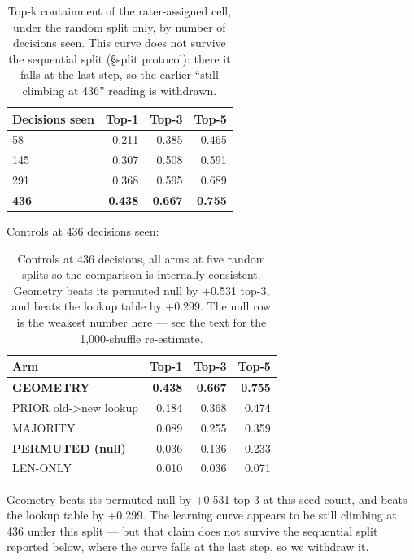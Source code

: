 \documentclass[11pt]{article}
\begin{document}
\begin{table}[h]
\centering
\begin{tabular}{lrrr}
\toprule
\textbf{Decisions seen} & \textbf{Top-1} & \textbf{Top-3} & \textbf{Top-5} \\
\midrule
58 & 0.211 & 0.385 & 0.465 \\
145 & 0.307 & 0.508 & 0.591 \\
291 & 0.368 & 0.595 & 0.689 \\
\textbf{436} & \textbf{0.438} & \textbf{0.667} & \textbf{0.755} \\
\bottomrule
\end{tabular}
\caption{Top-k containment of the rater-assigned cell, under the random split
only, by number of decisions seen. This curve does not survive the sequential
split (\S split protocol): there it falls at the last step, so the earlier
``still climbing at 436'' reading is withdrawn.}
\label{tab:learning}
\end{table}

Controls at 436 decisions seen:

\begin{table}[h]
\centering
\begin{tabular}{lrrr}
\toprule
\textbf{Arm} & \textbf{Top-1} & \textbf{Top-3} & \textbf{Top-5} \\
\midrule
\textbf{GEOMETRY} & \textbf{0.438} & \textbf{0.667} & \textbf{0.755} \\
PRIOR old->new lookup & 0.184 & 0.368 & 0.474 \\
MAJORITY & 0.089 & 0.255 & 0.359 \\
\textbf{PERMUTED (null)} & 0.036 & 0.136 & 0.233 \\
LEN-ONLY & 0.010 & 0.036 & 0.071 \\
\bottomrule
\end{tabular}
\caption{Controls at 436 decisions, all arms at five random splits so the
comparison is internally consistent. Geometry beats its permuted null by
+0.531 top-3, and beats the lookup table by +0.299. The null row is the
weakest number here --- see the text for the 1{,}000-shuffle re-estimate.}
\label{tab:controls}
\end{table}

Geometry beats its permuted null by +0.531 top-3 at this seed count, and
beats the lookup table by +0.299. The learning curve appears to be still
climbing at 436 under this split --- but that claim does not survive the
sequential split reported below, where the curve falls at the last step,
so we withdraw it.
\end{document}
